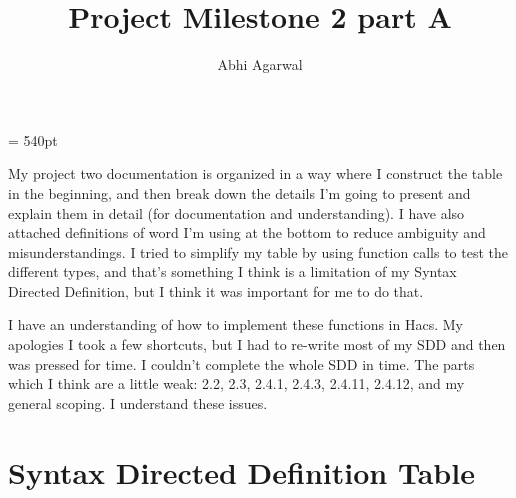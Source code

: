 \documentclass[11pt, oneside]{article}
\title{Project Milestone 2 part A}
\author{Abhi Agarwal}
\date{}
\begin{document}
\maketitle

\textwidth = 540pt

\par My project two documentation is organized in a way where I construct the table in the beginning, and then break down the details I'm going to present and explain them in detail (for documentation and understanding). I have also attached definitions of word I'm using at the bottom to reduce ambiguity and misunderstandings. I tried to simplify my table by using function calls to test the different types, and that's something I think is a limitation of my Syntax Directed Definition, but I think it was important for me to do that. 

\par I have an understanding of how to implement these functions in Hacs. My apologies I took a few shortcuts, but I had to re-write most of my SDD and then was pressed for time. I couldn't complete the whole SDD in time. The parts which I think are a little weak: 2.2, 2.3, 2.4.1, 2.4.3, 2.4.11, 2.4.12, and my general scoping. I understand these issues.

\section*{Syntax Directed Definition Table}
\end{document}
